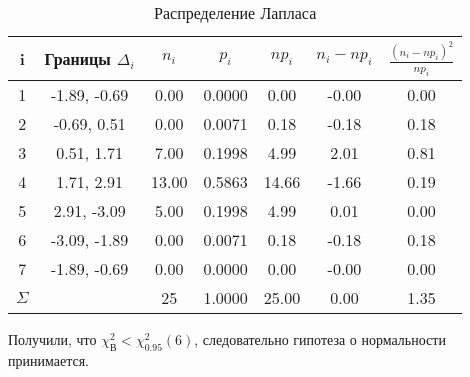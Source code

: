 \documentclass{article}
\begin{document}
\begin{table}
\begin{center}
\begin{tabular}{|c|c|c|c|c|c|c|}
\hline i & Границы $\Delta_i$ & $n_i$ & $p_i$ & $np_i$ & $n_i - np_i$ & $\frac{(n_i - np_i)^2}{np_i}$\\\hline
1 & -1.89, -0.69 & 0.00 & 0.0000 & 0.00 & -0.00 & 0.00\\
\hline
2 & -0.69, 0.51 & 0.00 & 0.0071 & 0.18 & -0.18 & 0.18\\
\hline
3 & 0.51, 1.71 & 7.00 & 0.1998 & 4.99 & 2.01 & 0.81\\
\hline
4 & 1.71, 2.91 & 13.00 & 0.5863 & 14.66 & -1.66 & 0.19\\
\hline
5 & 2.91, -3.09 & 5.00 & 0.1998 & 4.99 & 0.01 & 0.00\\
\hline
6 & -3.09, -1.89 & 0.00 & 0.0071 & 0.18 & -0.18 & 0.18\\
\hline
7 & -1.89, -0.69 & 0.00 & 0.0000 & 0.00 & -0.00 & 0.00\\
\hline
$\Sigma$ & & 25 & 1.0000 & 25.00 & 0.00 & 1.35 \\
\hline
\end{tabular}
\caption{Распределение Лапласа}
\end{center}
\end{table}

Получили, что $\chi_{\text{В}}^2 < \chi_{0.95}^2(6)$, следовательно гипотеза о нормальности принимается.
\end{document}
